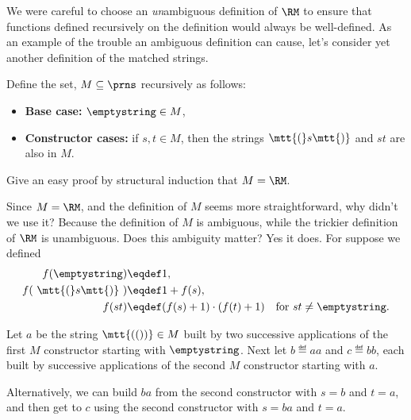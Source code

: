 \begin{definition}
We were careful to choose an \emph{un}ambiguous definition of $\RM$ to
ensure that functions defined recursively on the definition would always
be well-defined.  As an example of the trouble an ambiguous definition can
cause, let's consider yet another definition of the matched strings.

\begin{example}\label{M}
  Define the set, $M \subseteq \prns$ recursively as follows:
\begin{itemize}

\item \textbf{Base case:} $\emptystring \in M$,

\item \textbf{Constructor cases:} if $s,t \in M$, then
the strings $\mtt{(}s\mtt{)}$ and $st$ are also in $M$.
\end{itemize}
\end{example}

\begin{notesproblem}
Give an easy proof by structural induction that $M =\RM$.
\end{notesproblem}

Since $M = \RM$, and the definition of $M$ seems more straightforward, why
didn't we use it?  Because the definition of $M$ is ambiguous, while the
trickier definition of $\RM$ is unambiguous.  Does this ambiguity matter?
Yes it does.  For suppose we defined
\begin{align*}
  f(\emptystring)        & \eqdef 1,\\
  f(\ \mtt{(}s\mtt{)}\ ) & \eqdef 1+ f(s),\\
  f(st)                  & \eqdef (f(s)+1) \cdot (f(t)+1)
                            & \text{for } st\neq \emptystring.
\end{align*}

Let $a$ be the string $\mtt{(())} \in M$ built by two successive
applications of the first $M$ constructor starting with $\emptystring$.  Next
let $b \eqdef aa$ and $c \eqdef bb$, each built by successive applications
of the second $M$ constructor starting with $a$.

Alternatively, we can build $ba$ from the second constructor with $s=b$
and $t=a$, and then get to $c$ using the second constructor with $s=ba$
and $t=a$.


\end{definition}
